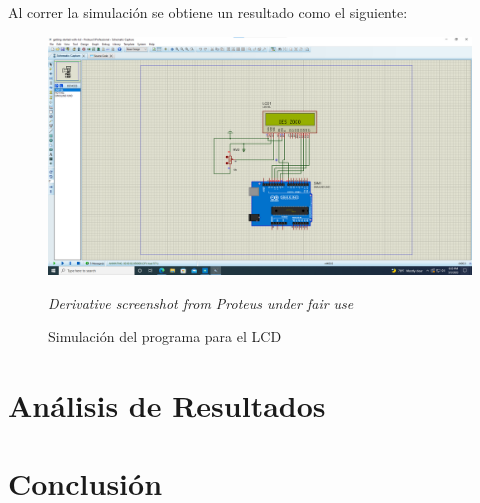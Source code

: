 \documentclass{article}
\begin{document}
    \bigbreak

    Al correr la simulación se obtiene un resultado como el siguiente:

    \begin{figure}[H]
        \centering
        \includegraphics[width=0.6\paperwidth]{images/sim-running.png}
        \caption{Simulación del programa para el LCD}\footnotesize
        \textit{Derivative screenshot from Proteus under fair use}
    \end{figure}

    \section{Análisis de Resultados}



    \section{Conclusión}



    \printbibliography
\end{document}
